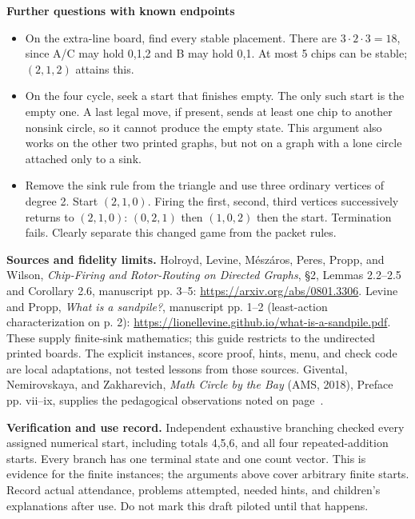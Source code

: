 \documentclass[11pt,letterpaper]{article}
\begin{document}
\textbf{Further questions with known endpoints}
\begin{itemize}
\item On the extra-line board, find every stable placement. There are $3\cdot2\cdot3=18$, since A/C may hold 0,1,2 and B may hold 0,1. At most 5 chips can be stable; $(2,1,2)$ attains this.
\item On the four cycle, seek a start that finishes empty. The only such start is the empty one. A last legal move, if present, sends at least one chip to another nonsink circle, so it cannot produce the empty state. This argument also works on the other two printed graphs, but not on a graph with a lone circle attached only to a sink.
\item Remove the sink rule from the triangle and use three ordinary vertices of degree 2. Start $(2,1,0)$. Firing the first, second, third vertices successively returns to $(2,1,0)$: $(0,2,1)$ then $(1,0,2)$ then the start. Termination fails. Clearly separate this changed game from the packet rules.
\end{itemize}
\textbf{Sources and fidelity limits.} Holroyd, Levine, M\'esz\'aros, Peres, Propp, and Wilson, \emph{Chip-Firing and Rotor-Routing on Directed Graphs}, \S2, Lemmas 2.2--2.5 and Corollary 2.6, manuscript pp. 3--5: \url{https://arxiv.org/abs/0801.3306}. Levine and Propp, \emph{What is a sandpile?}, manuscript pp. 1--2 (least-action characterization on p. 2): \url{https://lionellevine.github.io/what-is-a-sandpile.pdf}. These supply finite-sink mathematics; this guide restricts to the undirected printed boards. The explicit instances, score proof, hints, menu, and check code are local adaptations, not tested lessons from those sources. Givental, Nemirovskaya, and Zakharevich, \emph{Math Circle by the Bay} (AMS, 2018), Preface pp. vii--ix, supplies the pedagogical observations noted on page~\pageref{boards}.

\textbf{Verification and use record.} Independent exhaustive branching checked every assigned numerical start, including totals 4,5,6, and all four repeated-addition starts. Every branch has one terminal state and one count vector. This is evidence for the finite instances; the arguments above cover arbitrary finite starts. Record actual attendance, problems attempted, needed hints, and children's explanations after use. Do not mark this draft piloted until that happens.
\end{document}
